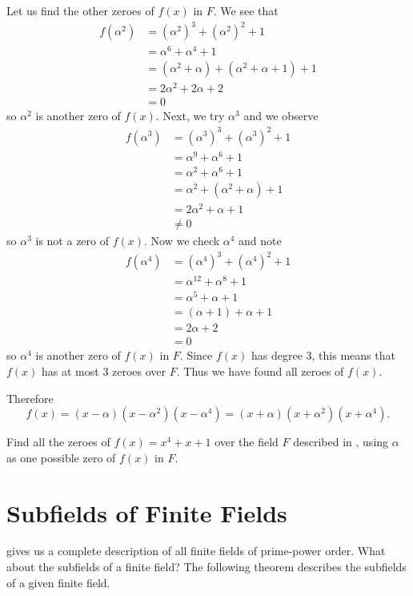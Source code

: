 \begin{example}
    Let us find the other zeroes of $f(x)$ in $F$. We see that
    \begin{align*}
        f(\alpha^2) &= (\alpha^2)^3 + (\alpha^2)^2 + 1\\
        &= \alpha^6 + \alpha^4 + 1\\
        &= (\alpha^2 + \alpha) + (\alpha^2 + \alpha + 1) + 1\\
        &= 2\alpha^2 + 2\alpha + 2\\
        &= 0
    \end{align*}
    so $\alpha^2$ is another zero of $f(x)$. Next, we try $\alpha^3$ and we observe
    \begin{align*}
        f(\alpha^3) &= (\alpha^3)^3 + (\alpha^3)^2 + 1\\
        &= \alpha^9 + \alpha^6 + 1\\
        &= \alpha^2 + \alpha^6 + 1\\
        &= \alpha^2 + (\alpha^2 + \alpha) + 1\\
        &= 2\alpha^2 + \alpha + 1\\
        &\neq 0
    \end{align*}
    so $\alpha^3$ is not a zero of $f(x)$. Now we check $\alpha^4$ and note
    \begin{align*}
        f(\alpha^4) &= (\alpha^4)^3 + (\alpha^4)^2 + 1\\
        &= \alpha^{12} + \alpha^8 + 1\\
        &= \alpha^5 + \alpha + 1\\
        &= (\alpha + 1) + \alpha + 1\\
        &= 2\alpha + 2\\
        &= 0
    \end{align*}
    so $\alpha^4$ is another zero of $f(x)$ in $F$. Since $f(x)$ has degree 3, this means that $f(x)$ has at most 3 zeroes over $F$. Thus we have found all zeroes of $f(x)$.

    Therefore
    \[
        f(x) = (x - \alpha)(x - \alpha^2)(x - \alpha^4) = (x + \alpha)(x + \alpha^2)(x + \alpha^4).
    \]
\end{example}

\begin{exercise}
    Find all the zeroes of $f(x) = x^4 + x + 1$ over the field $F$ described in , using $\alpha$ as one possible zero of $f(x)$ in $F$.
\end{exercise}

\section{Subfields of Finite Fields}
 gives us a complete description of all finite fields of prime-power order. What about the subfields of a finite field? The following theorem describes the subfields of a given finite field.

